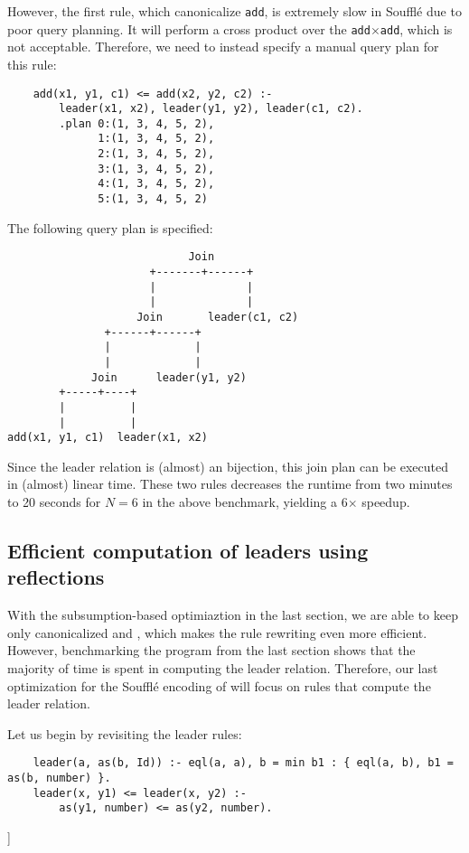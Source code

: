 However, the first rule, which canonicalize \verb|add|, 
 is extremely slow in Souffl\'e due to poor query planning.
It will perform a cross product over the \verb|add|$\times$\verb|add|,
 which is not acceptable.
Therefore, we need to instead specify a manual query plan for this rule:
\begin{verbatim}
    add(x1, y1, c1) <= add(x2, y2, c2) :-
        leader(x1, x2), leader(y1, y2), leader(c1, c2).
        .plan 0:(1, 3, 4, 5, 2), 
              1:(1, 3, 4, 5, 2), 
              2:(1, 3, 4, 5, 2), 
              3:(1, 3, 4, 5, 2), 
              4:(1, 3, 4, 5, 2), 
              5:(1, 3, 4, 5, 2)
\end{verbatim}
The following query plan is specified:
\begin{verbatim}
                            Join
                      +-------+------+
                      |              |
                      |              |
                    Join       leader(c1, c2)
               +------+------+
               |             |
               |             |
             Join      leader(y1, y2)
        +-----+----+
        |          |
        |          |
add(x1, y1, c1)  leader(x1, x2)
\end{verbatim}
Since the leader relation is (almost) an bijection,
 this join plan can be executed in (almost) linear time.
These two rules decreases the runtime from two minutes 
 to 20 seconds for $N=6$ in the above benchmark, 
 yielding a 6$\times$ speedup.

\subsection{Efficient computation of leaders using reflections}

With the subsumption-based optimiaztion in the last section,
 we are able to keep only canonicalized \enodes and \elcasses,
 which makes the rule rewriting even more efficient.
However, benchmarking the program from the last section
 shows that the majority of time is spent in computing the leader relation.
Therefore, our last optimization for the Souffl\'e encoding of \egraph
 will focus on rules that compute the leader relation.

Let us begin by revisiting the leader rules:
\begin{verbatim}
    leader(a, as(b, Id)) :- eql(a, a), b = min b1 : { eql(a, b), b1 = as(b, number) }.
    leader(x, y1) <= leader(x, y2) :-
        as(y1, number) <= as(y2, number).
\end{verbatim}]


